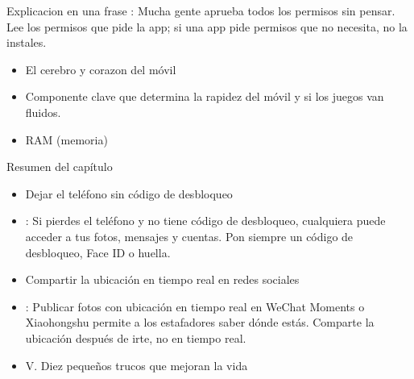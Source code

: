 \begin{tcbpractice}{Explicacion en una frase}
: Mucha gente aprueba todos los permisos sin pensar. Lee los permisos que pide la app; si una app pide permisos que no necesita, no la instales.

\begin{itemize}
  \item El cerebro y corazon del móvil
  \item Componente clave que determina la rapidez del móvil y si los juegos van fluidos.
  \item RAM (memoria)
\end{itemize}

\end{tcbpractice}

\begin{tcbsummary}{Resumen del capítulo}
\begin{itemize}
  \item Dejar el teléfono sin código de desbloqueo
  \item : Si pierdes el teléfono y no tiene código de desbloqueo, cualquiera puede acceder a tus fotos, mensajes y cuentas. Pon siempre un código de desbloqueo, Face ID o huella.
  \item Compartir la ubicación en tiempo real en redes sociales
  \item : Publicar fotos con ubicación en tiempo real en WeChat Moments o Xiaohongshu permite a los estafadores saber dónde estás. Comparte la ubicación después de irte, no en tiempo real.
  \item V. Diez pequeños trucos que mejoran la vida
\end{itemize}

\end{tcbsummary}
